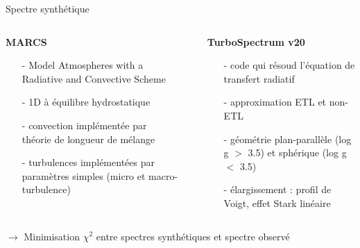 \documentclass[10pt]{beamer}
\begin{document}
\begin{frame}[fragile]{Spectre synthétique}
    \begin{columns}
        \begin{column}{0.48\textwidth}
            \begin{center}
                \textbf{MARCS}
               \begin{itemize}
                \item [-] Model Atmospheres with a Radiative and Convective Scheme
                \item [-] 1D à équilibre hydrostatique
                \item [-] convection implémentée par théorie de longueur de mélange
                \item [-] turbulences implémentées par paramètres simples (micro et macro-turbulence)
               \end{itemize}
            \end{center}
        \end{column}
        \begin{column}{0.04\textwidth}
        \end{column}
        \begin{column}{0.48\textwidth}
            \begin{center}
                \textbf{TurboSpectrum v20}  
                \begin{itemize}
                    \item [-] code qui résoud l'équation de transfert radiatif
                    \item [-] approximation ETL et non-ETL
                    \item [-] géométrie plan-parallèle (log g $>$ 3.5) et sphérique (log g $<$ 3.5)
                    \item [-] élargissement : profil de Voigt, effet Stark linéaire
                \end{itemize}
            \end{center}
        \end{column}

\end{columns}
\vfill 
$\rightarrow$ Minimisation $\chi^2$ entre spectres synthétiques et spectre observé
\end{frame}
\end{document}
